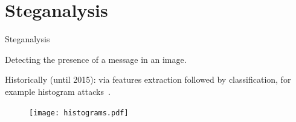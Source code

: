 \documentclass[10pt,aspectratio=169]{beamer}
\begin{document}

    


\section*{Steganalysis}

\begin{frame}{Steganalysis}

    \begin{center}
        \alert{Detecting the presence of a message in an image.}
    \end{center}

    \pause
    Historically (until 2015): via features extraction followed by classification, for example histogram attacks~.

    \begin{figure}
        \texttt{[image: histograms.pdf]}
    \end{figure}

\end{frame}
\end{document}
